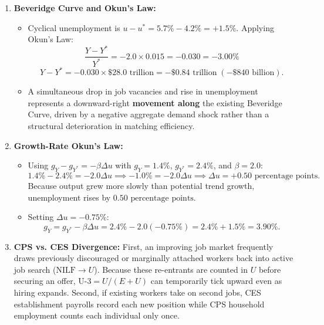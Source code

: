 \documentclass[11pt, a4paper]{article}
\begin{document}
\begin{enumerate}[leftmargin=1.5em, itemsep=6pt]
  \item \textbf{Beveridge Curve and Okun's Law:}
  \begin{itemize}[leftmargin=1.2em, itemsep=2pt]
    \item[(a)] Cyclical unemployment is $u - u^* = 5.7\% - 4.2\% = +1.5\%$. Applying Okun's Law:
    \[
      \frac{Y - Y^*}{Y^*} = -2.0 \times 0.015 = -0.030 = -3.00\%
    \]
    \[
      Y - Y^* = -0.030 \times \$28.0\text{ trillion} = -\$0.84\text{ trillion}\;(-\$840\text{ billion}).
    \]
    \item[(b)] A simultaneous drop in job vacancies and rise in unemployment represents a downward-right \textbf{movement along} the existing Beveridge Curve, driven by a negative aggregate demand shock rather than a structural deterioration in matching efficiency.
  \end{itemize}

  \item \textbf{Growth-Rate Okun's Law:}
  \begin{itemize}[leftmargin=1.2em, itemsep=2pt]
    \item[(a)] Using $g_Y - g_{Y^*} = -\beta \Delta u$ with $g_Y = 1.4\%$, $g_{Y^*} = 2.4\%$, and $\beta = 2.0$:
    \[
      1.4\% - 2.4\% = -2.0 \Delta u \implies -1.0\% = -2.0 \Delta u \implies \Delta u = +0.50\text{ percentage points}.
    \]
    Because output grew more slowly than potential trend growth, unemployment rises by $0.50\text{ percentage points}$.
    \item[(b)] Setting $\Delta u = -0.75\%$:
    \[
      g_Y = g_{Y^*} - \beta \Delta u = 2.4\% - 2.0(-0.75\%) = 2.4\% + 1.5\% = 3.90\%.
    \]
  \end{itemize}

  \item \textbf{CPS vs. CES Divergence:}
  First, an improving job market frequently draws previously discouraged or marginally attached workers back into active job search ($\text{NILF} \to U$). Because these re-entrants are counted in $U$ before securing an offer, $\text{U-3} = U / (E + U)$ can temporarily tick upward even as hiring expands. Second, if existing workers take on second jobs, CES establishment payrolls record each new position while CPS household employment counts each individual only once.
\end{enumerate}
\end{document}
